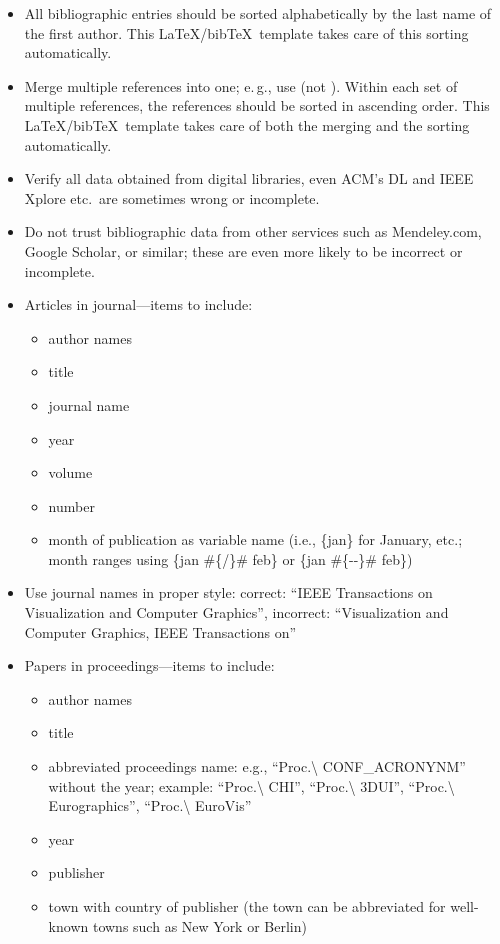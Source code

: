 \documentclass[journal]{vgtc}                     %
\begin{document}
\begin{itemize}
  \item All bibliographic entries should be sorted alphabetically by the last name of the first author.
        This \LaTeX/bib\TeX\ template takes care of this sorting automatically.
  \item Merge multiple references into one; e.\,g., use \cite{Max:1995:OMF,Kitware:2003} (not \cite{Kitware:2003}\cite{Max:1995:OMF}).
        Within each set of multiple references, the references should be sorted in ascending order.
        This \LaTeX/bib\TeX\ template takes care of both the merging and the sorting automatically.
  \item Verify all data obtained from digital libraries, even ACM's DL and IEEE Xplore  etc.\ are sometimes wrong or incomplete.
  \item Do not trust bibliographic data from other services such as Mendeley.com, Google Scholar, or similar; these are even more likely to be incorrect or incomplete.
  \item Articles in journal---items to include:
        \begin{itemize}
  	      \item author names
  	      \item title
  	      \item journal name
  	      \item year
  	      \item volume
  	      \item number
  	      \item month of publication as variable name (i.e., \{jan\} for January, etc.; month ranges using \{jan \#\{/\}\# feb\} or \{jan \#\{-{}-\}\# feb\})
        \end{itemize}
  \item Use journal names in proper style: correct: ``IEEE Transactions on Visualization and Computer Graphics'', incorrect: ``Visualization and Computer Graphics, IEEE Transactions on''
  \item Papers in proceedings---items to include:
        \begin{itemize}
  	      \item author names
  	      \item title
  	      \item abbreviated proceedings name: e.g., ``Proc.\textbackslash{} CONF\_ACRONYNM'' without the year; example: ``Proc.\textbackslash{} CHI'', ``Proc.\textbackslash{} 3DUI'', ``Proc.\textbackslash{} Eurographics'', ``Proc.\textbackslash{} EuroVis''
  	      \item year
  	      \item publisher
  	      \item town with country of publisher (the town can be abbreviated for well-known towns such as New York or Berlin)
        \end{itemize}


\end{itemize}
\end{document}
